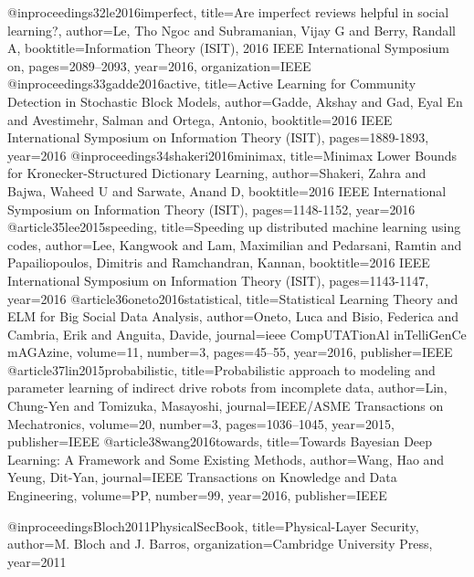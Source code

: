 {{{{{{{{@inproceedings{32le2016imperfect,
  title={Are imperfect reviews helpful in social learning?},
  author={Le, Tho Ngoc and Subramanian, Vijay G and Berry, Randall A},
  booktitle={Information Theory (ISIT), 2016 IEEE International Symposium on},
  pages={2089--2093},
  year={2016},
  organization={IEEE}
}
@inproceedings{33gadde2016active,
  title={Active Learning for Community Detection in Stochastic Block Models},
  author={Gadde, Akshay and Gad, Eyal En and Avestimehr, Salman and Ortega, Antonio},
  booktitle={2016 IEEE International Symposium on Information Theory (ISIT)},
  pages={1889-1893},
  year={2016}
}
@inproceedings{34shakeri2016minimax,
  title={Minimax Lower Bounds for Kronecker-Structured Dictionary Learning},
  author={Shakeri, Zahra and Bajwa, Waheed U and Sarwate, Anand D},
  booktitle={2016 IEEE International Symposium on Information Theory (ISIT)},
  pages={1148-1152},
  year={2016}
}
@article{35lee2015speeding,
  title={Speeding up distributed machine learning using codes},
  author={Lee, Kangwook and Lam, Maximilian and Pedarsani, Ramtin and Papailiopoulos, Dimitris and Ramchandran, Kannan},
  booktitle={2016 IEEE International Symposium on Information Theory (ISIT)},
  pages={1143-1147},
  year={2016}
}
@article{36oneto2016statistical,
  title={Statistical Learning Theory and ELM for Big Social Data Analysis},
  author={Oneto, Luca and Bisio, Federica and Cambria, Erik and Anguita, Davide},
  journal={ieee CompUTATionAl inTelliGenCe mAGAzine},
  volume={11},
  number={3},
  pages={45--55},
  year={2016},
  publisher={IEEE}
}
@article{37lin2015probabilistic,
  title={Probabilistic approach to modeling and parameter learning of indirect drive robots from incomplete data},
  author={Lin, Chung-Yen and Tomizuka, Masayoshi},
  journal={IEEE/ASME Transactions on Mechatronics},
  volume={20},
  number={3},
  pages={1036--1045},
  year={2015},
  publisher={IEEE}
}
@article{38wang2016towards,
  title={Towards Bayesian Deep Learning: A Framework and Some Existing Methods},
  author={Wang, Hao and Yeung, Dit-Yan},
  journal={IEEE Transactions on Knowledge and Data Engineering},
  volume={PP},
  number={99},
  year={2016},
  publisher={IEEE}
}






@inproceedings{Bloch2011PhysicalSecBook,
	title={Physical-Layer Security},
	author={M. Bloch and J. Barros},
	organization={Cambridge University Press},
	year={2011}
}



}}}}}}}}
